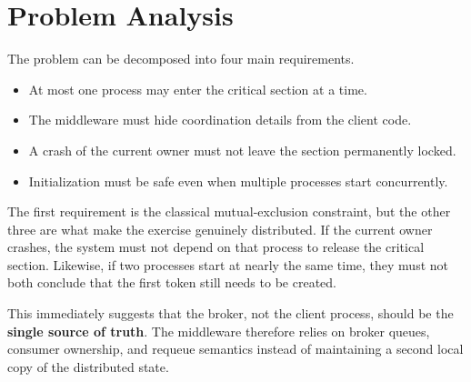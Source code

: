 \clearpage
\section{Problem Analysis}

The problem can be decomposed into four main requirements.
\begin{itemize}
    \item At most one process may enter the critical section at a time.
    \item The middleware must hide coordination details from the client code.
    \item A crash of the current owner must not leave the section permanently locked.
    \item Initialization must be safe even when multiple processes start concurrently.
\end{itemize}

The first requirement is the classical mutual-exclusion constraint, but the
other three are what make the exercise genuinely distributed. If the current
owner crashes, the system must not depend on that process to release the
critical section. Likewise, if two processes start at nearly the same time,
they must not both conclude that the first token still needs to be created.

This immediately suggests that the broker, not the client process, should be
the \textbf{single source of truth}. The middleware therefore relies on broker
queues, consumer ownership, and requeue semantics instead of maintaining a
second local copy of the distributed state.

